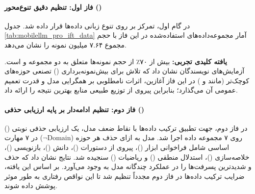 \paragraph*{فاز اول: تنظیم دقیق تنوع‌محور ()}
در گام اول، تمرکز بر روی تنوع زبانی داده‌ها قرار داده شد. جدول \ref{tab:mobilellm_pro_ift_data} آمار مجموعه‌داده‌های استفاده‌شده در این فاز با حجم مجموع ۷.۶۴ میلیون نمونه را نشان می‌دهد.

\begin{table}[htbp]
\centering
\caption{آمار مجموعه‌داده‌های مورد استفاده در فاز اول تنظیم دقیق دستورالعمل‌ها ()}
\label{tab:mobilellm_pro_ift_data}
\end{table}

\textbf{یافته کلیدی تجربی:} بیش از ۷۰٪ از حجم نمونه‌ها متعلق به دو مجموعه  و  است. آزمایش‌های نویسندگان نشان داد که تلاش برای بیش‌نمونه‌برداری () تصنعی حوزه‌های کوچک‌تر (مانند  و ) در این فاز آغازین، اثرات نامطلوبی بر همگرایی مدل و قدرت تعمیم عمومی آن می‌گذارد؛ بنابراین پیروی از توزیع طبیعی منابع بهترین نتیجه را ارائه داد.

\paragraph*{فاز دوم: تنظیم ادامه‌دار بر پایه ارزیابی حذفی ()}
در فاز دوم، جهت تطبیق ترکیب داده‌ها با نقاط ضعف مدل، یک ارزیابی حذفی نوبتی () روی ۷ مجموعه داده اجرا شد. مدل به ازای حذف هر حوزه ($\neg\text{Domain}$) در ۷ مهارت اساسی شامل فراخوانی ابزار ()، پیروی از دستورات ()، دانش ()، بازنویسی ()، خلاصه‌سازی ()، استدلال منطقی () و ریاضیات () سنجیده شد. نتایج نشان داد که حذف  و  شدیدترین پسرفت‌ها را در عملکرد چندگانه مدل به وجود می‌آورد. بر اساس این یافته، ضرایب ترکیب داده‌ها در فاز دوم مجدداً تنظیم شد تا این نواقص رفتاری به طور موثر پوشش داده شوند.

